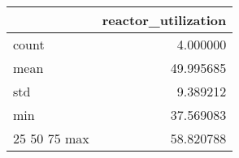 \begin{tabular}{lr}
\toprule
 & reactor\_utilization \\
\midrule
count & 4.000000 \\
mean & 49.995685 \\
std & 9.389212 \\
min & 37.569083 \\
25%
50%
75%
max & 58.820788 \\
\bottomrule
\end{tabular}

